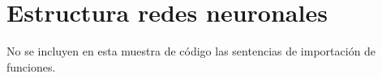 
\chapter{Estructura redes neuronales}\label{ap:estructura_ann}

No se incluyen en esta muestra de código las sentencias de importación de funciones.

\vspace{10pt}



\endinput
